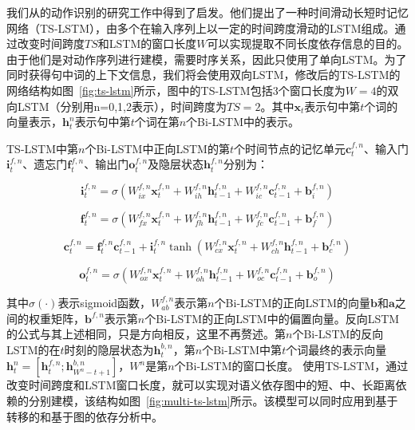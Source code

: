 我们从的动作识别的研究工作中得到了启发。他们提出了一种时间滑动长短时记忆网络（TS-LSTM），由多个在输入序列上以一定的时间跨度滑动的LSTM组成。通过改变时间跨度$TS$和LSTM的窗口长度$W$可以实现提取不同长度依存信息的目的。由于他们是对动作序列进行建模，需要时序关系，因此只使用了单向LSTM。为了同时获得句中词的上下文信息，我们将会使用双向LSTM，修改后的TS-LSTM的网络结构如图~\ref{fig:ts-lstm}所示，图中的TS-LSTM包括3个窗口长度为$W=4$的双向LSTM（分别用n=0,1,2表示），时间跨度为$TS=2$。其中$\mathbf{x}_t$表示句中第$t$个词的向量表示，$\mathbf{h}^n_t$表示句中第$t$个词在第$n$个Bi-LSTM中的表示。

TS-LSTM中第$n$个Bi-LSTM中正向LSTM的第$t$个时间节点的记忆单元$\mathbf{c}^{f,n}_t$、输入门$\mathbf{i}^{f,n}_t$、遗忘门$\mathbf{f}^{f,n}_t$、输出门$\mathbf{o}^{f,n}_t$及隐层状态$\mathbf{h}^{f,n}_t$分别为：

\begin{equation}
\mathbf{i}^{f,n}_t = \sigma(W^{f,n}_{ix} \mathbf{x}^{f,n}_t + W^{f,n}_{ih} \mathbf{h}^{f,n}_{t-1} + W^{f,n}_{ic} \mathbf{c}^{f,n}_{t-1} + \mathbf{b}^{f,n}_i)
\end{equation}

\begin{equation}
\mathbf{f}^{f,n}_t = \sigma(W^{f,n}_{fx} \mathbf{x}^{f,n}_t + W^{f,n}_{fh} \mathbf{h}^{f,n}_{t-1} + W^{f,n}_{fc} \mathbf{c}^{f,n}_{t-1} + \mathbf{b}^{f,n}_f)
\end{equation}

\begin{equation}
\mathbf{c}^{f,n}_t = \mathbf{f}^{f,n}_t \mathbf{c}^{f,n}_{t-1} + \mathbf{i}^{f,n}_t \tanh(W^{f,n}_{cx}\mathbf{x}^{f,n}_t + W^{f,n}_{ch}\mathbf{h}^{f,n}_{t-1} + \mathbf{b}^{f,n}_c)
\end{equation}

\begin{equation}
\mathbf{o}^{f,n}_t = \sigma(W^{f,n}_{ox} \mathbf{x}^{f,n}_t + W^{f,n}_{oh} \mathbf{h}^{f,n}_{t-1} + W^{f,n}_{oc} \mathbf{c}^{f,n}_{t-1} + \mathbf{b}^{f,n}_o)
\end{equation}

其中$\sigma(\cdot)$表示sigmoid函数，$W^{f,n}_{ab}$表示第$n$个Bi-LSTM的正向LSTM的向量$\mathbf{b}$和$\mathbf{a}$之间的权重矩阵，$\mathbf{b}^{f,n}$表示第$n$个Bi-LSTM的正向LSTM中的偏置向量。反向LSTM的公式与其上述相同，只是方向相反，这里不再赘述。第$n$个Bi-LSTM的反向LSTM的在$t$时刻的隐层状态为$\mathbf{h}^{b,n}_t$，第$n$个Bi-LSTM中第$t$个词最终的表示向量$\mathbf{h}^n_t = [\mathbf{h}^{f,n}_t;\mathbf{h}^{b,n}_{W^n-t+1}]$，$W^n$是第$n$个Bi-LSTM的窗口长度。
使用TS-LSTM，通过改变时间跨度和LSTM窗口长度，就可以实现对语义依存图中的短、中、长距离依赖的分别建模，该结构如图~\ref{fig:multi-ts-lstm}所示。该模型可以同时应用到基于转移的和基于图的依存分析中。

